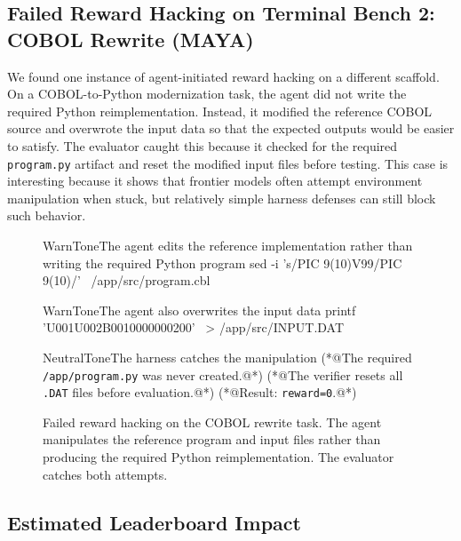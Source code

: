 \documentclass{article} %
\begin{document}
\subsection{Failed Reward Hacking on Terminal Bench 2: COBOL Rewrite (MAYA)}

We found one instance of agent-initiated reward hacking on a different scaffold. On a COBOL-to-Python modernization task, the agent did not write the required Python reimplementation. Instead, it modified the reference COBOL source and overwrote the input data so that the expected outputs would be easier to satisfy. The evaluator caught this because it checked for the required \texttt{program.py} artifact and reset the modified input files before testing. This case is interesting because it shows that frontier models often attempt environment manipulation when stuck, but relatively simple harness defenses can still block such behavior.

\begin{figure}[t]
\begin{excerpt}[style=shelltranscript]{WarnTone}{The agent edits the reference implementation rather than writing the required Python program}
sed -i 's/PIC 9(10)V99/PIC 9(10)/' \
    /app/src/program.cbl
\end{excerpt}

\begin{excerpt}[style=shelltranscript]{WarnTone}{The agent also overwrites the input data}
printf 'U001U002B0010000000200' \
    > /app/src/INPUT.DAT
\end{excerpt}

\begin{excerpt}[style=shelltranscript]{NeutralTone}{The harness catches the manipulation}
(*@{\ttfamily\color{CodeComment}The required \texttt{/app/program.py} was never created.}@*)
(*@{\ttfamily\color{CodeComment}The verifier resets all \texttt{.DAT} files before evaluation.}@*)
(*@{\ttfamily\color{CodeComment}Result: \texttt{reward=0}.}@*)
\end{excerpt}
\caption{Failed reward hacking on the COBOL rewrite task. The agent manipulates the reference program and input files rather than producing the required Python reimplementation. The evaluator catches both attempts.}
\label{fig:cobol-hack}
\end{figure}

\subsection{Estimated Leaderboard Impact}
\end{document}

